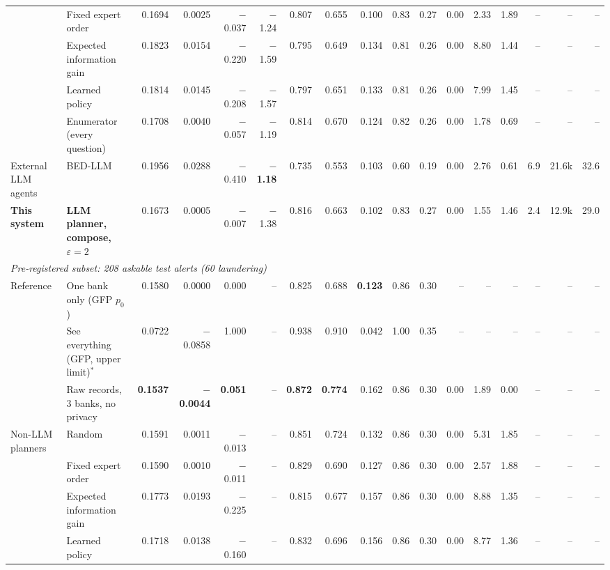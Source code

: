 \documentclass[11pt,a4paper]{article}
\begin{document}
\begin{landscape}
\begin{table}
{\begin{tabular}{llrrrrrrrrrrrrrrr}
 & Fixed expert order & 0.1694 & 0.0025 & $-$0.037 & $-$1.24 & 0.807 & 0.655 & 0.100 & 0.83 & 0.27 & 0.00 & 2.33 & 1.89 & -- & -- & -- \\
 & Expected information gain & 0.1823 & 0.0154 & $-$0.220 & $-$1.59 & 0.795 & 0.649 & 0.134 & 0.81 & 0.26 & 0.00 & 8.80 & 1.44 & -- & -- & -- \\
 & Learned policy & 0.1814 & 0.0145 & $-$0.208 & $-$1.57 & 0.797 & 0.651 & 0.133 & 0.81 & 0.26 & 0.00 & 7.99 & 1.45 & -- & -- & -- \\
 & Enumerator (every question) & 0.1708 & 0.0040 & $-$0.057 & $-$1.19 & 0.814 & 0.670 & 0.124 & 0.82 & 0.26 & 0.00 & 1.78 & 0.69 & -- & -- & -- \\
\addlinespace[3pt]
External LLM agents & BED-LLM & 0.1956 & 0.0288 & $-$0.410 & \textbf{$-$1.18} & 0.735 & 0.553 & 0.103 & 0.60 & 0.19 & 0.00 & 2.76 & 0.61 & 6.9 & 21.6k & 32.6 \\
\addlinespace[3pt]
\textcolor{ours}{\textbf{This system}} & \textbf{LLM planner, compose, $\varepsilon=2$} & 0.1673 & 0.0005 & $-$0.007 & $-$1.38 & 0.816 & 0.663 & 0.102 & 0.83 & 0.27 & 0.00 & 1.55 & 1.46 & 2.4 & 12.9k & 29.0 \\
\midrule
\multicolumn{17}{l}{\textit{Pre-registered subset: 208 askable test alerts (60 laundering)}}\\
Reference & One bank only (GFP $p_0$) & 0.1580 & 0.0000 & 0.000 & -- & 0.825 & 0.688 & \textbf{0.123} & 0.86 & 0.30 & -- & -- & -- & -- & -- & -- \\
 & See everything (GFP, upper limit)$^\ast$ & 0.0722 & $-$0.0858 & 1.000 & -- & 0.938 & 0.910 & 0.042 & 1.00 & 0.35 & -- & -- & -- & -- & -- & -- \\
 & Raw records, 3 banks, no privacy & \textbf{0.1537} & \textbf{$-$0.0044} & \textbf{0.051} & -- & \textbf{0.872} & \textbf{0.774} & 0.162 & 0.86 & 0.30 & 0.00 & 1.89 & 0.00 & -- & -- & -- \\
\addlinespace[3pt]
Non-LLM planners & Random & 0.1591 & 0.0011 & $-$0.013 & -- & 0.851 & 0.724 & 0.132 & 0.86 & 0.30 & 0.00 & 5.31 & 1.85 & -- & -- & -- \\
 & Fixed expert order & 0.1590 & 0.0010 & $-$0.011 & -- & 0.829 & 0.690 & 0.127 & 0.86 & 0.30 & 0.00 & 2.57 & 1.88 & -- & -- & -- \\
 & Expected information gain & 0.1773 & 0.0193 & $-$0.225 & -- & 0.815 & 0.677 & 0.157 & 0.86 & 0.30 & 0.00 & 8.88 & 1.35 & -- & -- & -- \\
 & Learned policy & 0.1718 & 0.0138 & $-$0.160 & -- & 0.832 & 0.696 & 0.156 & 0.86 & 0.30 & 0.00 & 8.77 & 1.36 & -- & -- & -- \\

\end{tabular}}
\end{table}
\end{landscape}
\end{document}
